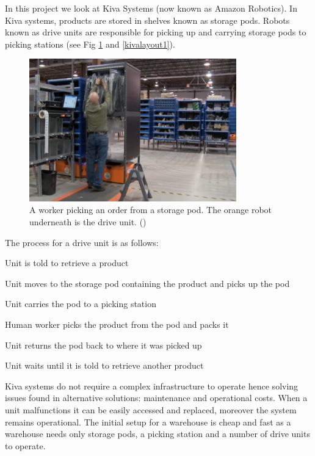 \documentclass[a4paper,11pt]{article}
\begin{document}
In this project we look at Kiva Systems (now known as Amazon Robotics). In Kiva systems, products are stored in shelves known as storage pods. Robots known as drive units are responsible for picking up and carrying storage pods to picking stations (see Fig \ref{kivaprocess} and \ref{kivalayout1}).
\begin{figure}[h!]
	\centering
	\includegraphics[width=0.8\textwidth ]{graphics/kivaprocess}
	\caption{A worker picking an order from a storage pod. The orange robot underneath is the drive unit. (\cite{kivayoutube2010quietlogistics})}
	\label{kivaprocess}
\end{figure}

\noindent The process for a drive unit is as follows:

\begin{compactenum}
	\item Unit is told to retrieve a product
	\item Unit moves to the storage pod containing the product and picks up the pod
	\item Unit carries the pod to a picking station
	\item Human worker picks the product from the pod and packs it
	\item Unit returns the pod back to where it was picked up
	\item Unit waits until it is told to retrieve another product
\end{compactenum}

\noindent Kiva systems do not require a complex infrastructure to operate hence solving issues found in alternative solutions: maintenance and operational costs. When a unit malfunctions it can be easily accessed and replaced, moreover the system remains operational. The initial setup for a warehouse is cheap and fast as a warehouse needs only storage pods, a picking station and a number of drive units to operate.
\end{document}
